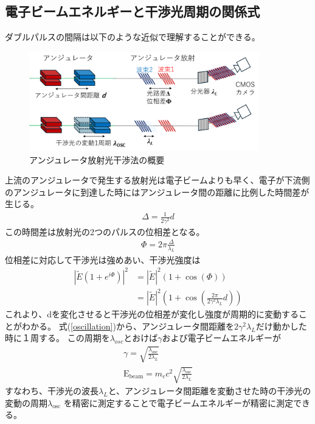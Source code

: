 \documentclass[a4paper,11pt,uplatex]{jsbook}
\begin{document}
\subsection{電子ビームエネルギーと干渉光周期の関係式}
ダブルパルスの間隔は以下のような近似で理解することができる。
\begin{figure}
  \centering
  \includegraphics[width=10cm]{image/2-lambdaosc.png}
  \caption{アンジュレータ放射光干渉法の概要}
\end{figure}
上流のアンジュレータで発生する放射光は電子ビームよりも早く、電子が下流側のアンジュレータに到達した時にはアンジュレータ間の距離に比例した時間差が生じる。
\begin{eqnarray}
  \Delta = \frac{1}{2\gamma^2}d \label{path shift}
\end{eqnarray}
この時間差は放射光の2つのパルスの位相差となる。
\begin{eqnarray}
  \Phi = 2\pi \frac{\Delta}{\lambda_L}
\end{eqnarray}
位相差に対応して干渉光は強めあい、干渉光強度は
\begin{eqnarray}
  |\tilde{E} \left( 1+ e^{i\Phi}\right)|^2 
&= |\tilde{E}|^2 \left( 1 + \cos(\Phi) \right)\\
&= |\tilde{E}|^2 \left( 1 + \cos(\frac{2\pi}{2\gamma^2\lambda_L}d) \right) 
  \label{oscillation}
\end{eqnarray}
これより、dを変化させると干渉光の位相差が変化し強度が周期的に変動することがわかる。
式(\ref{oscillation})から、アンジュレータ間距離を$2\gamma^2\lambda_L$だけ動かした時に１周する。
この周期を$\lambda_{osc}$とおけば$\gamma$および電子ビームエネルギーが
\begin{eqnarray}
  \gamma = \sqrt{\frac{\lambda_{\text{osc}}}{2\lambda_L}}\\
  \text{E}_\text{beam} =m_e c^2  \sqrt{\frac{\lambda_{\text{osc}}}{2\lambda_L}} \label{zero order energy formula}
\end{eqnarray}
すなわち、干渉光の波長$\lambda_L$と、アンジュレータ間距離を変動させた時の干渉光の変動の周期$\lambda_{\text{osc}}$
を精密に測定することで電子ビームエネルギーが精密に測定できる。
\end{document}
